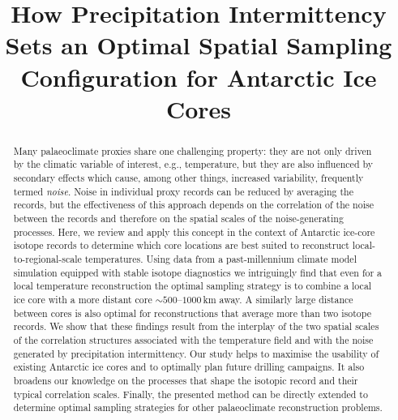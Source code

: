 \documentclass[cp, manuscript]{copernicus}
\begin{document}
\title{How Precipitation Intermittency Sets an Optimal Spatial Sampling
  Configuration for Antarctic Ice Cores}




\received{}
\pubdiscuss{}
\revised{}
\accepted{}
\published{}


\maketitle

\begin{abstract} Many palaeoclimate proxies share one challenging property: they
are not only driven by the climatic variable of interest, e.g., temperature, but
they are also influenced by secondary effects which cause, among other things,
increased variability, frequently termed \emph{noise}. Noise in individual proxy
records can be reduced by averaging the records, but the effectiveness of this
approach depends on the correlation of the noise between the records and
therefore on the spatial scales of the noise-generating processes. Here, we
review and apply this concept in the context of Antarctic ice-core isotope
records to determine which core locations are best suited to reconstruct
local-to-regional-scale temperatures. Using data from a past-millennium climate
model simulation equipped with stable isotope diagnostics we intriguingly find
that even for a local temperature reconstruction the optimal sampling strategy
is to combine a local ice core with a more distant core $\sim500$--$1000$\,km
away. A similarly large distance between cores is also optimal for
reconstructions that average more than two isotope records. We show that these
findings result from the interplay of the two spatial scales of the correlation
structures associated with the temperature field and with the noise generated by
precipitation intermittency. Our study helps to maximise the usability of
existing Antarctic ice cores and to optimally plan future drilling campaigns. It
also broadens our knowledge on the processes that shape the isotopic record and
their typical correlation scales. Finally, the presented method can be directly
extended to determine optimal sampling strategies for other palaeoclimate
reconstruction problems.
\end{abstract}
\end{document}
